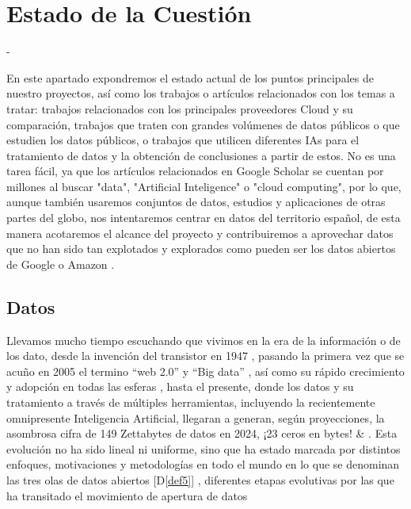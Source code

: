 \chapter{Estado de la Cuestión}
\label{cap:estadoDeLaCuestion}


-

En este apartado expondremos el estado actual de los puntos principales de nuestro proyectos, así como los trabajos o artículos relacionados con los temas a tratar: trabajos relacionados con los principales proveedores Cloud y su comparación, trabajos que traten con grandes volúmenes de datos públicos o que estudien los datos públicos, o trabajos que utilicen diferentes IAs para el tratamiento de datos y la obtención de conclusiones a partir de estos. No es una tarea fácil, ya que los artículos relacionados en Google Scholar se cuentan por millones al buscar "data", "Artificial Inteligence" o "cloud computing", por lo que, aunque también usaremos conjuntos de datos, estudios y aplicaciones de otras partes del globo, nos intentaremos centrar en datos del territorio español, de esta manera acotaremos el alcance del proyecto y contribuiremos a aprovechar datos que no han sido tan explotados y explorados como pueden ser los datos abiertos de Google \citep{googleDataCommon} o Amazon \citep{AWSDataCommon}. 

\section{Datos}
\label{sec:EstudiosDatos}

Llevamos mucho tiempo escuchando que vivimos en la era de la información o de los dato, desde la invención del transistor en 1947 \citep{wikiInformationAge}, pasando la primera vez que se acuño en 2005 el termino ``web 2.0''  y ``Big data''  \citep{HistoryOfBigData}, así como su rápido crecimiento y adopción en todas las esferas \citep{brown2011you}, hasta el presente, donde los datos y su tratamiento a través de múltiples herramientas, incluyendo la recientemente omnipresente Inteligencia Artificial, llegaran a generan, según proyecciones, la asombrosa cifra de 149 Zettabytes de datos en 2024, ¡23 ceros en bytes! \citep{BigDataStatista} \& \citep{BigDataStadisticsMarket}. Esta evolución no ha sido lineal ni uniforme, sino que ha estado marcada por distintos enfoques, motivaciones y metodologías en todo el mundo en lo que se denominan las tres olas de datos abiertos [D\ref{def5}] , diferentes etapas evolutivas por las que ha transitado el movimiento de apertura de datos

